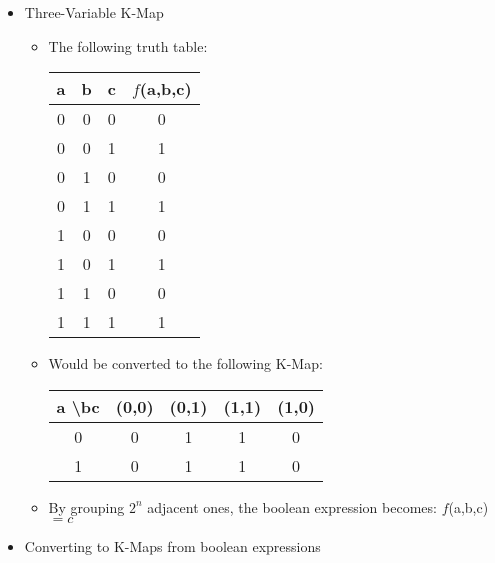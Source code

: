 \begin{itemize}

  \item Three-Variable K-Map

    \begin{itemize}

      \item The following truth table:

        \begin{center}
        \begin{tabular}[h!]{| c c c | c |}
          \hline
          a & b & c & $f$(a,b,c)\\
          \hline
          0 & 0 & 0 & 0\\
          0 & 0 & 1 & 1\\
          0 & 1 & 0 & 0\\
          0 & 1 & 1 & 1\\
          1 & 0 & 0 & 0\\
          1 & 0 & 1 & 1\\
          1 & 1 & 0 & 0\\
          1 & 1 & 1 & 1\\
          \hline
        \end{tabular}
      \end{center}

      \item Would be converted to the following K-Map:

        \begin{center}
        \begin{tabular}[h!]{c | c c c c |}
          a \textbackslash bc & (0,0) & (0,1) & (1,1) & (1,0)\\
          \hline
          0 & 0 & 1 & 1 & 0\\
          \hline
          1 & 0 & 1 & 1 & 0\\
          \hline
        \end{tabular}
      \end{center}

    \item By grouping $2^n$ adjacent ones, the boolean expression becomes: $f$(a,b,c)$=c$

    \end{itemize}

  \item Converting to K-Maps from boolean expressions

    \begin{itemize}


\end{itemize}
\end{itemize}
